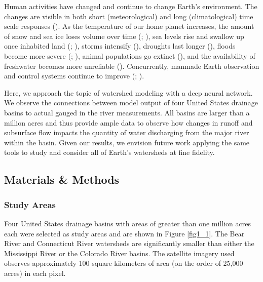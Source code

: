 \begin{refsection}
Human activities have changed and continue to change Earth’s environment. The changes are visible in both short (meteorological) and long (climatological) time scale responses (\cite{stott2016climate}). As the temperature of our home planet increases, the amount of snow and sea ice loses volume over time (\cite{qin2020agricultural}; \cite{min2022emerging}), sea levels rise and swallow up once inhabited land (\cite{tebaldi2021extreme}; \cite{sevellec2017arctic}), storms intensify (\cite{karl1997coming}), droughts last longer (\cite{underwood2015models}), floods become more severe (\cite{milly2002increasing}; \cite{hirabayashi2013global}), animal populations go extinct (\cite{parmesan2000impacts}), and the availability of freshwater becomes more unreliable (\cite{gleick2021freshwater}). Concurrently, manmade Earth observation and control systems continue to improve (\cite{crisp2020benefits}; \cite{minzu2021optimal}). 

Here, we approach the topic of watershed modeling with a deep neural network. We observe the connections between model output of four United States drainage basins to actual gauged in the river measurements. All basins are larger than a million acres and thus provide ample data to observe how changes in runoff and subsurface flow impacts the quantity of water discharging from the major river within the basin. Given our results, we envision future work applying the same tools to study and consider all of Earth’s watersheds at fine fidelity.

\subsection{Materials \& Methods}
\subsubsection{Study Areas}
Four United States drainage basins with areas of greater than one million acres each were selected as study areas and are shown in Figure \ref{fig1_1}. The Bear River and Connecticut River watersheds are significantly smaller than either the Mississippi River or the Colorado River basins. The satellite imagery used observes approximately 100 square kilometers of area (on the order of 25,000 acres) in each pixel. 



\end{refsection}
